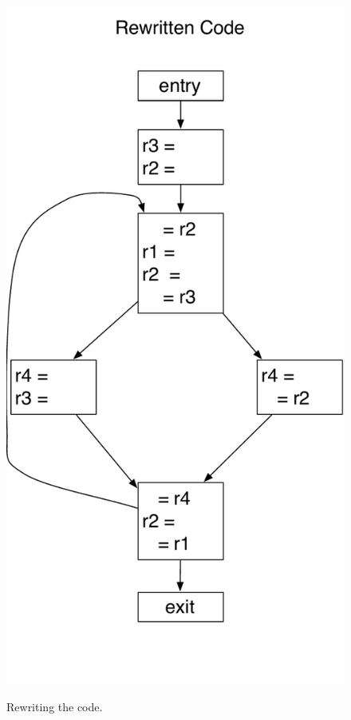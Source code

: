 \clearpage

\begin{figure}[!htbp]
    \centering
    \caption{Rewriting the code.}
    \includegraphics[scale=0.50]{register_allocation3.pdf}
    \label{fig:regalloc3}
\end{figure}

